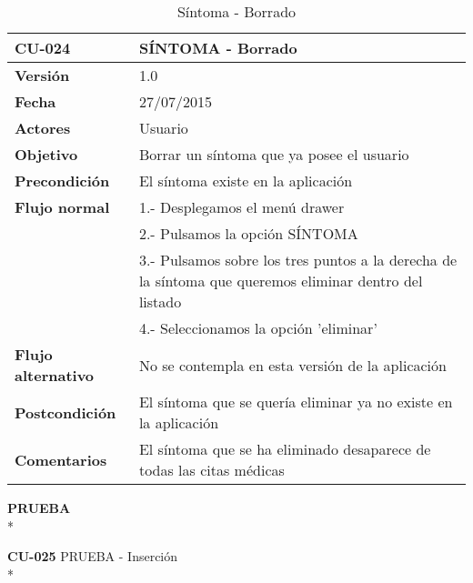 \documentclass[../pfc.tex]{subfiles}
\begin{document}
	\begin{table}[H]
		\centering
		\begin{tabular}[t]{|p{3cm}|p{9.5cm}|}
			\hline \textbf{CU-024} & \textbf{SÍNTOMA - Borrado} \\*
			\hline\hline \textbf{Versión} & 1.0 \\*
			\hline\hline \textbf{Fecha} & 27/07/2015 \\*
			\hline\textbf{Actores} 	& Usuario\\*
			\hline \textbf{Objetivo} & Borrar un síntoma que ya posee el usuario\\* 			
			\hline \textbf{Precondición} & El síntoma existe en la aplicación\\* 
			\hline \textbf{Flujo normal} & 1.- Desplegamos el menú drawer \\* 
			& 2.- Pulsamos la opción SÍNTOMA\\*	
			& 3.- Pulsamos sobre los tres puntos a la derecha de la síntoma que queremos eliminar dentro del listado\\*	
			& 4.- Seleccionamos la opción 'eliminar'\\*	
			\hline \textbf{Flujo alternativo} & No se contempla en esta versión de la aplicación \\* 
			\hline \textbf{Postcondición} & El síntoma que se quería eliminar ya no existe en la aplicación \\* 
			\hline \textbf{Comentarios}   & El síntoma que se ha eliminado desaparece de todas las citas médicas\\*
			\hline
		\end{tabular}
		\caption{Síntoma - Borrado}
		\label{tabla:caso024}
	\end{table}
	
	
	
	\textbf{PRUEBA}\\*
	
	\textbf{CU-025}	PRUEBA - Inserción\\*
	
\end{document}
